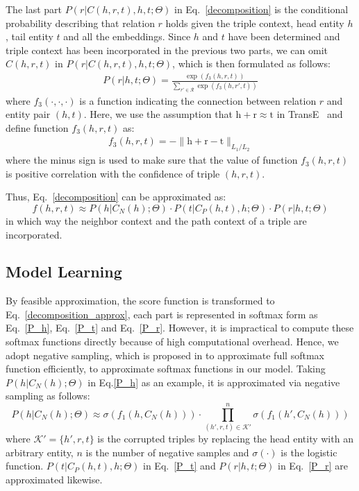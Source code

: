 The last part $P(r|C(h,r,t),h,t;\Theta)$ in Eq.~\eqref{decomposition} is the conditional probability describing that relation $r$ holds given the triple context, head entity $h$, tail entity $t$ and all the embeddings. Since $h$ and $t$ have been determined and triple context has been incorporated in the previous two parts, we can omit $C(h,r,t)$ in $P(r|C(h,r,t),h,t;\Theta)$, which is then formulated as follows:
\begin{align}\label{P_r}
  P(r|h,t;\Theta) = \frac{\exp(f_3(h,r,t))}{\sum_{r' \in \mathcal{R}} \exp(f_3(h,r',t))}
\end{align}
where $f_3(\cdot, \cdot, \cdot)$ is a function indicating the connection between relation $r$ and entity pair $(h,t)$. Here, we use the assumption that $\bm{\mathrm{h}} + \bm{\mathrm{r}} \approx \bm{\mathrm{t}}$ in TransE~\cite{BordesUGWY13} and define function $f_3(h,r,t)$ as:
\begin{align}\label{f3}
  f_3(h,r,t) = -\|\bm{\mathrm{h}} + \bm{\mathrm{r}} - \bm{\mathrm{t}}\|_{L_1/L_2}
\end{align}
where the minus sign is used to make sure that the value of function $f_3(h,r,t)$ is positive correlation with the confidence of triple $(h,r,t)$.

Thus, Eq.~\eqref{decomposition} can be approximated as:
\begin{equation}\label{decomposition_approx}
  f(h,r,t) \approx P(h|C_N(h);\Theta) \cdot P(t|C_P(h,t),h;\Theta) \cdot P(r|h,t;\Theta)
\end{equation}
in which way the neighbor context and the path context of a triple are incorporated.


\subsection{Model Learning}
By feasible approximation, the score function is transformed to Eq.~\eqref{decomposition_approx}, each part is represented in softmax form as Eq.~\eqref{P_h}, Eq.~\eqref{P_t} and Eq.~\eqref{P_r}. However, it is impractical to compute these softmax functions directly because of high computational overhead. Hence, we adopt negative sampling, which is proposed in \cite{DBLP:conf/nips/MikolovSCCD13} to approximate full softmax function efficiently, to approximate softmax functions in our model. Taking $P(h|C_N(h);\Theta)$ in Eq.\eqref{P_h} as an example, it is approximated via negative sampling as follows:
\begin{equation}\label{approximation}
    P(h|C_N(h);\Theta) \approx \sigma(f_1(h, C_N(h))) \cdot \prod_{(h',r,t) \in \mathcal{K}'}^{n} \sigma(f_1(h', C_N(h)))
\end{equation}
where $\mathcal{K}' = \{h', r, t\}$ is the corrupted triples by replacing the head entity with an arbitrary entity, $n$ is the number of negative samples and $\sigma(\cdot)$ is the logistic function. $P(t|C_P(h,t),h;\Theta)$ in Eq.~\eqref{P_t} and $P(r|h,t;\Theta)$ in Eq.~\eqref{P_r} are approximated likewise.

